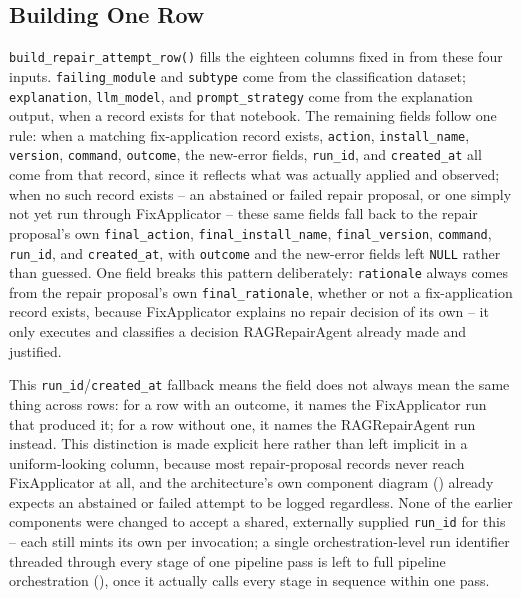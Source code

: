\subsection{Building One Row}
\label{sec:m-resultlogger-row}

\texttt{build\_repair\_attempt\_row()} fills the eighteen columns fixed in
 from these four inputs. \texttt{failing\_module}
and \texttt{subtype} come from the classification dataset;
\texttt{explanation}, \texttt{llm\_model}, and \texttt{prompt\_strategy}
come from the explanation output, when a record exists for that notebook.
The remaining fields follow one rule: when a matching fix-application
record exists, \texttt{action}, \texttt{install\_name}, \texttt{version},
\texttt{command}, \texttt{outcome}, the new-error fields, \texttt{run\_id},
and \texttt{created\_at} all come from that record, since it reflects what
was actually applied and observed; when no such record exists -- an
abstained or failed repair proposal, or one simply not yet run through
FixApplicator -- these same fields fall back to the repair proposal's own
\texttt{final\_action}, \texttt{final\_install\_name},
\texttt{final\_version}, \texttt{command}, \texttt{run\_id}, and
\texttt{created\_at}, with \texttt{outcome} and the new-error fields left
\texttt{NULL} rather than guessed. One field breaks this pattern
deliberately: \texttt{rationale} always comes from the repair proposal's own
\texttt{final\_rationale}, whether or not a fix-application record exists,
because FixApplicator explains no repair decision of its own -- it only
executes and classifies a decision RAGRepairAgent already made and
justified.

This \texttt{run\_id}/\texttt{created\_at} fallback means the field does not
always mean the same thing across rows: for a row with an outcome, it names
the FixApplicator run that produced it; for a row without one, it names the
RAGRepairAgent run instead. This distinction is made explicit here rather
than left implicit in a uniform-looking column, because most repair-proposal
records never reach FixApplicator at all, and the architecture's own
component diagram () already expects an
abstained or failed attempt to be logged regardless. None of the earlier
components were changed to accept a shared, externally supplied
\texttt{run\_id} for this -- each still mints its own per invocation; a
single orchestration-level run identifier threaded through every stage of
one pipeline pass is left to full pipeline orchestration
(), once it actually calls every stage in sequence
within one pass.

